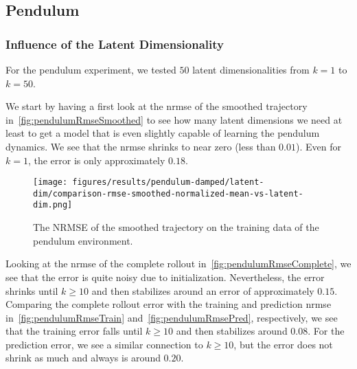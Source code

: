 	\subsection{Pendulum} %
		\subsubsection{Influence of the Latent Dimensionality}
			For the pendulum experiment, we tested \(50\) latent dimensionalities from \( k = 1 \) to \( k = 50 \).

			We start by having a first look at the \ac{nrmse} of the smoothed trajectory in~\autoref{fig:pendulumRmseSmoothed} to see how many latent dimensions we need at least to get a model that is even slightly capable of learning the pendulum dynamics. We see that the \ac{nrmse} shrinks to near zero (less than \( 0.01 \)). Even for \( k = 1 \), the error is only approximately \( 0.18 \).

			\begin{figure}
				\centering
				\texttt{[image: figures/results/pendulum-damped/latent-dim/comparison-rmse-smoothed-normalized-mean-vs-latent-dim.png]}
				\caption[Error of the smoothed trajectory on the training data of the pendulum experiment]{The NRMSE of the smoothed trajectory on the training data of the pendulum environment.}
				\label{fig:pendulumRmseSmoothed}
			\end{figure}

			Looking at the \ac{nrmse} of the complete rollout in~\autoref{fig:pendulumRmseComplete}, we see that the error is quite noisy due to initialization. Nevertheless, the error shrinks until \( k \geq 10 \) and then stabilizes around an error of approximately \(0.15\). Comparing the complete rollout error with the training and prediction \ac{nrmse} in~\autoref{fig:pendulumRmseTrain} and~\autoref{fig:pendulumRmsePred}, respectively, we see that the training error falls until \( k \geq 10 \) and then stabilizes around \(0.08\). For the prediction error, we see a similar connection to \( k \geq 10 \), but the error does not shrink as much and always is around \(0.20\).


